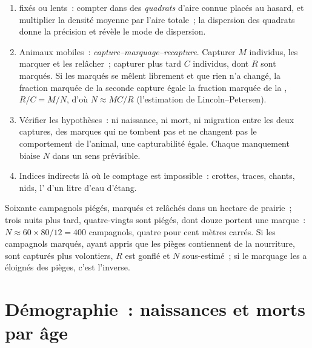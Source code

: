\begin{method}\label{met:b1:populations:counting}
\begin{enumerate}
  \item {} fixés ou lents~: compter dans des \emph{quadrats}
        d'aire connue placés au hasard, et multiplier la densité
        moyenne par l'aire totale~; la dispersion des quadrats donne la
        précision et révèle le mode de dispersion.
  \item Animaux mobiles~: \emph{capture--marquage--recapture}. Capturer
        $M$ individus, les marquer et les relâcher~; capturer plus tard
        $C$ individus, dont $R$ sont marqués. Si les marqués se mêlent
        librement et que rien n'a changé, la fraction marquée de la
        seconde capture égale la fraction marquée de la ,
        $R/C = M/N$, d'où $N \approx MC/R$ (l'estimation de
        Lincoln--Petersen).
  \item Vérifier les hypothèses~: ni naissance, ni mort, ni migration
        entre les deux captures, des marques qui ne tombent pas et ne
        changent pas le comportement de l'animal, une capturabilité
        égale. Chaque manquement biaise $N$ dans un sens prévisible.
  \item Indices indirects là où le comptage est impossible~: crottes,
        traces, chants, nids, l' d'un litre d'eau d'étang.
\end{enumerate}
\end{method}

\begin{example}\label{ex:b1:populations:voles}
Soixante campagnols piégés, marqués et relâchés dans un hectare de
prairie~; trois nuits plus tard, quatre-vingts sont piégés, dont douze
portent une marque~: $N \approx 60\times 80/12 = 400$ campagnols, quatre
pour cent mètres carrés. Si les campagnols marqués, ayant appris que
les pièges contiennent de la nourriture, sont capturés plus volontiers,
$R$ est gonflé et $N$ sous-estimé~; si le marquage les a éloignés des
pièges, c'est l'inverse.
\end{example}

\section{Démographie~: naissances et morts par âge}

